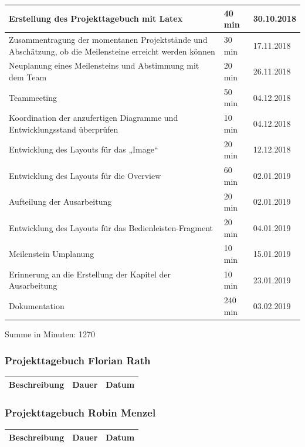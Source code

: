 \begin{longtable}{|p{10cm}|p{2cm}|p{2cm}|}
Erstellung des Projekttagebuch mit Latex & 40 min & 30.10.2018 \\ \hline
Zusammentragung der momentanen Projektstände und Abschätzung, ob die Meilensteine erreicht werden können & 30 min & 17.11.2018 \\ \hline
Neuplanung eines Meilensteins und Abstimmung mit dem Team & 20 min & 26.11.2018 \\ \hline
Teammeeting & 50 min & 04.12.2018 \\ \hline
Koordination der anzufertigen Diagramme und Entwicklungsstand überprüfen& 10 min & 04.12.2018 \\ \hline
Entwicklung des Layouts für das „Image“ & 20 min & 12.12.2018 \\ \hline
Entwicklung des Layouts für die Overview &  60 min & 02.01.2019 \\ \hline
Aufteilung der Ausarbeitung & 20 min & 02.01.2019 \\ \hline
Entwicklung des Layouts für das Bedienleisten-Fragment & 20 min & 04.01.2019 \\ \hline
Meilenstein Umplanung & 10 min & 15.01.2019 \\ \hline
Erinnerung an die Erstellung der Kapitel der Ausarbeitung & 10 min & 23.01.2019 \\ \hline
Dokumentation & 240 min & 03.02.2019 \\ \hline
\end{longtable}
Summe in Minuten: 1270

\newpage
\subsubsection{Projekttagebuch Florian Rath}
\begin{longtable}{|p{10cm}|p{2cm}|p{2cm}|}
\hline
{\textbf{Beschreibung}} & {\textbf{Dauer}} & {\textbf{Datum}} \\ \hline

\end{longtable}

\newpage
\subsubsection{Projekttagebuch Robin Menzel}
\begin{longtable}{|p{10cm}|p{2cm}|p{2cm}|}
\hline
{\textbf{Beschreibung}} & {\textbf{Dauer}} & {\textbf{Datum}} \\ \hline

\end{longtable}


